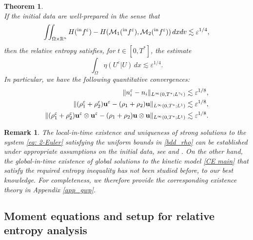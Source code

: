 \documentclass[10pt,reqno]{amsart}
\numberwithin{equation}{section}
\newtheorem{theorem}{Theorem}[section]
\newtheorem{remark}{Remark}[section]
\newcommand{\R}{\mathbb R}
\newcommand{\calM}{\mathcal M}
\newcommand{\ve}{\varepsilon}
\begin{document}
\begin{theorem}
\[\]
If the initial data are well-prepared in the sense that
\[
        \iint_{\Omega \times \R^n} H({}^{\rm in}f^\ve) - H(\calM_1({}^{\rm in}f^\ve),\calM_2({}^{\rm in}f^\ve))\,dxdv \lesssim \ve^{1/4},
\]
    then the relative entropy satisfies, for $t\in [0,T^*]$, the estimate
\[
        \int_{\Omega} \eta(U^\ve | U)\,dx \lesssim \ve^{1/4}.
\]
    In particular, we have the following quantitative convergences:
    \begin{equation}\label{eq: hyd}
    \begin{split}
        \|n_i^\ve - n_i\|_{L^\infty(0,T^*;L^{\gamma_i})} \lesssim \ve^{1/8},\\
        \|(\rho_1^\ve + \rho_2^\ve)  {\bf{u}}^\ve - (\rho_1 + \rho_2) {\bf{u}}\|_{L^\infty(0,T^*;L^1)} \lesssim \ve^{1/8}, \\
        \|(\rho_1^\ve + \rho_2^\ve){\bf{u}}^\ve\otimes {\bf{u}}^\ve - (\rho_1 + \rho_2) {\bf{u}}\otimes {\bf{u}}\|_{L^\infty(0,T^*;L^1)} \lesssim \ve^{1/8}.
        \end{split}
    \end{equation}
\end{theorem}

\begin{remark} The local-in-time existence and uniqueness of strong solutions to the system \eqref{eq: 2-Euler} satisfying the uniform bounds in \eqref{bdd_rho} can be established under appropriate assumptions on the initial data, see \cite{D79} and \cite[Proposition 1.3]{MV08}. On the other hand, the global-in-time existence of global solutions to the kinetic model \eqref{CE main} that satisfy the required entropy inequality has not been studied before, to our best knowledge. For completeness, we therefore provide the corresponding existence theory in Appendix \ref{app_gwp}.  
\end{remark}


\subsection{Moment equations and setup for relative entropy analysis}
\end{document}
